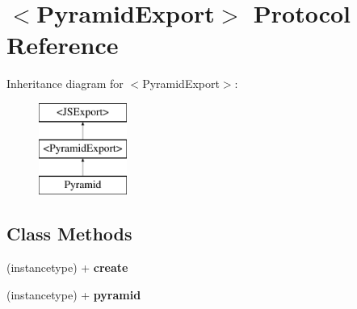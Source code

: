 \hypertarget{protocol_pyramid_export-p}{}\section{$<$Pyramid\+Export$>$ Protocol Reference}
\label{protocol_pyramid_export-p}
Inheritance diagram for $<$Pyramid\+Export$>$\+:\begin{figure}[H]
\begin{center}
\leavevmode
\includegraphics[height=3.000000cm]{protocol_pyramid_export-p}
\end{center}
\end{figure}
\subsection*{Class Methods}
\begin{DoxyCompactItemize}
\item 
\hypertarget{protocol_pyramid_export-p_a87175cee765539465a9daf5d4ade005c}{}(instancetype) + {\bfseries create}\label{protocol_pyramid_export-p_a87175cee765539465a9daf5d4ade005c}

\item 
\hypertarget{protocol_pyramid_export-p_a81e399abc87721caf279795bfda43724}{}(instancetype) + {\bfseries pyramid}\label{protocol_pyramid_export-p_a81e399abc87721caf279795bfda43724}

\end{DoxyCompactItemize}
